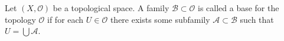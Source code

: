 Let $(X, \mathcal{O})$ be a topological space. A family $\mathcal{B} \subset \mathcal{O}$ is called a base for the topology $\mathcal{O}$ if for each $U \in \mathcal{O}$ there exists some subfamily $\mathcal{A} \subset \mathcal{B}$ such that $U = \bigcup \mathcal{A}$.